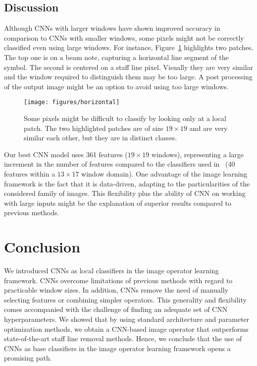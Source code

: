 \documentclass[conference]{IEEEtran}
\begin{document}
\subsection{Discussion}

Although CNNs with larger windows have shown improved accuracy 
in comparison to CNNs with smaller windows, some pixels 
might not be correctly classified even using large windows.
For instance, Figure~\ref{fig:horizontal} highlights two patches. The
top one is on a beam note, capturing a horizontal line segment of the
symbol. The second is centered on a staff line pixel. Visually they
are very similar and the window required to distinguish them may be
too large.
A post processing of the output image might be an option to avoid
using too large windows.

\begin{figure}[htb]
\centering
\texttt{[image: figures/horizontal]}
\caption{Some pixels might be difficult to classify by looking 
only at a local patch. The two highlighted patches are of size
$19\times 19$ and are very similar each other, but they are in
distinct classes.}
\label{fig:horizontal}
\end{figure}

Our best CNN model uses 361 features ($19\times 19$ windows),
representing a large increment in the number of features compared to
the classifiers used in~\cite{2017:IgorPR} (40 features within a
$13\times 17$ window domain). One advantage of the image learning
framework is the fact that it is data-driven, adapting to the
particularities of the considered family of images. This flexibility
plus the ability of CNN on working with large inputs might be the
explanation of superior results compared to previous methods. 


\section{Conclusion}
\label{sec:conclusion}

We introduced CNNs as local classifiers in the image operator learning
framework. CNNs overcome limitations of previous methods with regard
to practicable window sizes. In addition, CNNs remove the need of
manually selecting features or combining simpler operators. This
generality and flexibility comes accompanied with the challenge of
finding an adequate set of CNN hyperparameters. We showed that by
using standard architecture and parameter optimization methods, we
obtain a CNN-based image operator that outperforms state-of-the-art
staff line removal methods. Hence, we conclude that the use of CNNs as
base classifiers in the image operator learning framework opens a
promising path.
\end{document}
